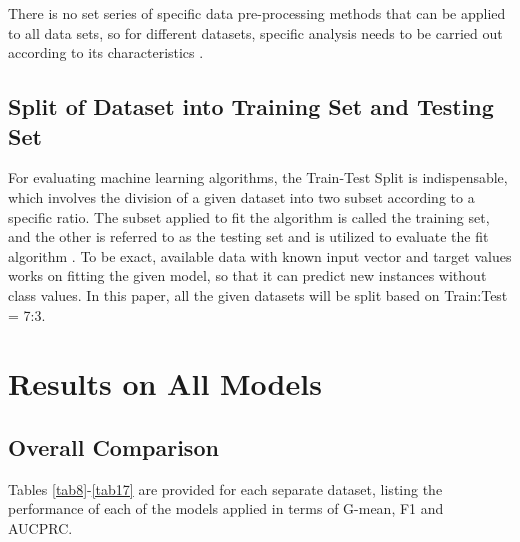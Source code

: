 There is no set series of specific data pre-processing methods that can be applied to all data sets, so for different datasets, specific analysis needs to be carried out according to its characteristics \cite{80}.

\subsection{Split of Dataset into Training Set and Testing Set}
For evaluating machine learning algorithms, the Train-Test Split is indispensable, which involves the division of a given dataset into two subset according to a specific ratio. The subset applied to fit the algorithm is called the training set, and the other is referred to as the testing set and is utilized to evaluate the fit algorithm \cite{102}. To be exact, available data with known input vector and target values works on fitting the given model, so that it can predict new instances without class values. In this paper, all the given datasets will be split based on Train:Test = 7:3.

\section{Results on All Models}
\subsection{Overall Comparison}
Tables \ref{tab8}-\ref{tab17} are provided for each separate dataset, listing the performance of each of the models applied in terms of G-mean, F1 and AUCPRC. 

